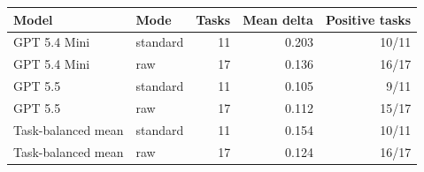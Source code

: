 \begin{tabular}{llrrr}
\toprule
Model & Mode & Tasks & Mean delta & Positive tasks \\
\midrule
GPT 5.4 Mini & standard & 11 & 0.203 & 10/11 \\
GPT 5.4 Mini & raw & 17 & 0.136 & 16/17 \\
GPT 5.5 & standard & 11 & 0.105 & 9/11 \\
GPT 5.5 & raw & 17 & 0.112 & 15/17 \\
Task-balanced mean & standard & 11 & 0.154 & 10/11 \\
Task-balanced mean & raw & 17 & 0.124 & 16/17 \\
\bottomrule
\end{tabular}
